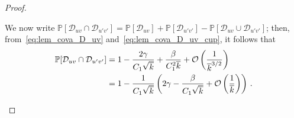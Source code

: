 \documentclass[journal]{IEEEtran}
\newcommand{\Cov}{\mathrm{Cov}}
\theoremstyle{definition}
\theoremstyle{definition}
\newcommand{\Dc}{\mathcal{D}}
\newcommand{\Ec}{\mathcal{E}}
\newcommand{\PP}{\mathbb{P}}
\newcommand{\rE}{\mathrm{E}}
\newcommand{\kb}{\overline{k}}
\newcommand{\bigO}{\mathcal{O}}
\begin{document}
\begin{proof}
\begin{enumerate}

        We now write $\PP[\Dc_{uv} \cap \Dc_{u'v'}] = \PP[\Dc_{uv}] + \PP[\Dc_{u'v'}] 
- \PP[\Dc_{uv} \cup \Dc_{u'v'}]$; then, from~\eqref{eq:lem_cova_D_uv} 
and~\eqref{eq:lem_cova_D_uv_cup}, it follows that
\begin{align}
    \PP[\Dc_{uv} \cap \Dc_{u'v'}] \notag 
    &=  1 - \frac{2\gamma}{C_1 \sqrt{\kb}}  
       + \frac{\beta}{C_1^2 \kb} + \bigO\left( \frac{1}{\kb^{3/2}} \right) \notag \\
    &= 1 - \frac{1}{C_1 \sqrt{\kb}} \left( 2\gamma - \frac{\beta}{C_1 \sqrt{\kb}} 
       + \bigO\left( \frac{1}{\kb} \right) \right) \,.
    \label{eq:lem_cova_Duv_cap_Du'v'}
\end{align}

\end{enumerate}
\end{proof}
\end{document}
